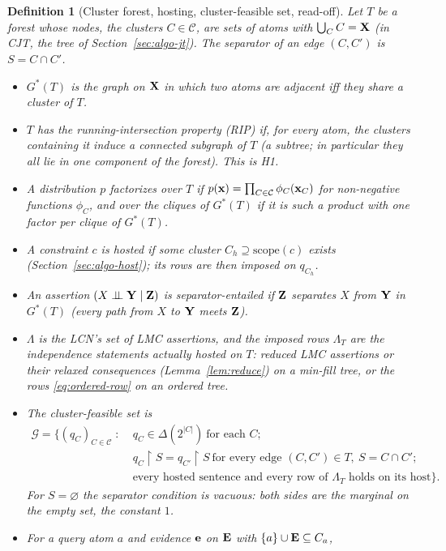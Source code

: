 \documentclass{article} %
\newtheorem{definition}{Definition}
\newcommand{\indep}{\perp\!\!\!\perp}
\newcommand{\restr}{\!\restriction\!}
\newcommand{\scope}{\mathrm{scope}}
\begin{document}
\begin{definition}[Cluster forest, hosting, cluster-feasible set, read-off]\label{def:d5}
Let $T$ be a forest whose nodes, the \emph{clusters} $C\in\mathcal C$, are sets of
atoms with $\bigcup_C C=\mathbf{X}$ (in \textsc{CJT}, the tree of
Section~\ref{sec:algo-jt}). The separator of an edge $(C,C')$ is $S=C\cap C'$.
\begin{itemize}
  \item $G^\ast(T)$ is the graph on $\mathbf{X}$ in which two atoms are adjacent iff they
    share a cluster of $T$.
  \item $T$ has the \emph{running-intersection property} (RIP) if, for every atom,
    the clusters containing it induce a connected subgraph of $T$ (a subtree; in
    particular they all lie in one component of the forest). This is H1.
  \item A distribution $p$ \emph{factorizes over $T$} if
    $p(\mathbf{x})=\prod_{C\in\mathcal C}\phi_C(\mathbf{x}_C)$ for non-negative functions
    $\phi_C$, and \emph{over the cliques of $G^\ast(T)$} if it is such a product
    with one factor per clique of $G^\ast(T)$.
  \item A constraint $c$ is \emph{hosted} if some cluster $C_h\supseteq\scope(c)$
    exists (Section~\ref{sec:algo-host}); its rows are then imposed on $q_{C_h}$.
  \item An assertion $(X\indep \bY\mid \bZ)$ is \emph{separator-entailed} if $\mathbf{Z}$
    separates $X$ from $\mathbf{Y}$ in $G^\ast(T)$ (every path from $X$ to $\mathbf{Y}$ meets $\mathbf{Z}$).
  \item $\Lambda$ is the LCN's set of LMC assertions, and the \emph{imposed rows}
    $\Lambda_T$ are the independence statements actually hosted on $T$: reduced
    LMC assertions or their relaxed consequences (Lemma~\ref{lem:reduce}) on a
    min-fill tree, or the rows \eqref{eq:ordered-row} on an ordered tree.
  \item The \emph{cluster-feasible set} is
  \begin{align*}
    \mathcal G=\bigl\{(q_C)_{C\in\mathcal C}\;:\;
      &q_C\in\Delta(2^{|C|})\ \text{for each }C;\\
      &q_C\restr S=q_{C'}\restr S\ \text{for every edge }(C,C')\in T,\ S=C\cap C';\\
      &\text{every hosted sentence and every row of }\Lambda_T\text{ holds on its host}\bigr\}.
  \end{align*}
    For $S=\varnothing$ the separator condition is vacuous: both sides are the
    marginal on the empty set, the constant $1$.
  \item For a query atom $a$ and evidence $\mathbf{e}$ on $\mathbf{E}$ with $\{a\}\cup\mathbf{E}\subseteq C_a$,

\end{itemize}
\end{definition}
\end{document}
